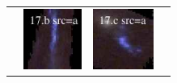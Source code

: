 \documentclass[useAMS,usenatbib]{mn2e}
\begin{document}
\begin{table}
\begin{tabular}{cccc}
    & \multicolumn{1}{m{1.7cm}}{\includegraphics[height=2.00cm,clip]{figs/enfw_img/rgb.pre_17_b_a_tri.ps}}
    & \multicolumn{1}{m{1.7cm}}{\includegraphics[height=2.00cm,clip]{figs/enfw_img/rgb.pre_17_c_a_tri.ps}} \\
  \end{tabular}

\end{table}
\end{document}
